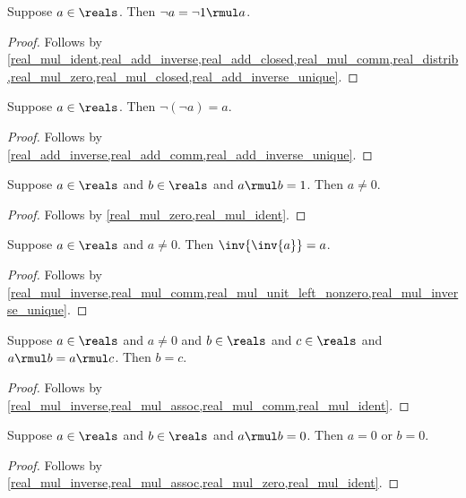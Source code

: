 \begin{proposition}\label{real_neg_as_mul}
    Suppose $a\in\reals$.
    Then $\neg{a} = \neg{1} \rmul a$.
\end{proposition}
\begin{proof}
    Follows by \cref{real_mul_ident,real_add_inverse,real_add_closed,real_mul_comm,real_distrib,real_mul_zero,real_mul_closed,real_add_inverse_unique}.
\end{proof}

\begin{proposition}\label{real_neg_neg}
    Suppose $a\in\reals$.
    Then $\neg{(\neg{a})} = a$.
\end{proposition}
\begin{proof}
    Follows by \cref{real_add_inverse,real_add_comm,real_add_inverse_unique}.
\end{proof}

\begin{lemma}\label{real_mul_unit_left_nonzero}
    Suppose $a\in\reals$ and $b\in\reals$ and $a \rmul b = 1$.
    Then $a \neq 0$.
\end{lemma}
\begin{proof}
    Follows by \cref{real_mul_zero,real_mul_ident}.
\end{proof}

\begin{proposition}\label{real_inv_inv}
    Suppose $a\in\reals$ and $a\neq 0$.
    Then $\inv{\inv{a}} = a$.
\end{proposition}
\begin{proof}
    Follows by \cref{real_mul_inverse,real_mul_comm,real_mul_unit_left_nonzero,real_mul_inverse_unique}.
\end{proof}

\begin{proposition}\label{real_mul_cancel}
    Suppose $a\in\reals$ and $a\neq 0$ and $b\in\reals$ and $c\in\reals$ and $a \rmul b = a \rmul c$.
    Then $b = c$.
\end{proposition}
\begin{proof}
    Follows by \cref{real_mul_inverse,real_mul_assoc,real_mul_comm,real_mul_ident}.
\end{proof}

\begin{proposition}\label{real_mul_zero_product}
    Suppose $a\in\reals$ and $b\in\reals$ and $a \rmul b = 0$.
    Then $a = 0$ or $b = 0$.
\end{proposition}
\begin{proof}
    Follows by \cref{real_mul_inverse,real_mul_assoc,real_mul_zero,real_mul_ident}.
\end{proof}

